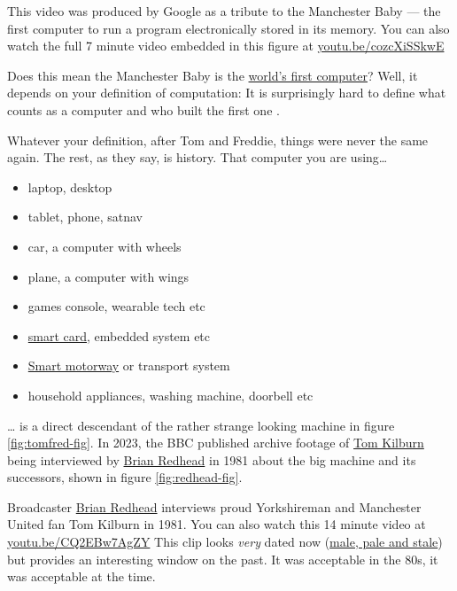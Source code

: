 \documentclass[
  12pt,
]{book}
\providecommand{\tightlist}{%
  \setlength{\itemsep}{0pt}\setlength{\parskip}{0pt}}
\begin{document}
\label{fig:baby-fig}This video was produced by Google as a tribute to the Manchester Baby --- the first computer to run a program electronically stored in its memory. You can also watch the full 7 minute video embedded in this figure at \href{https://youtu.be/cozcXiSSkwE}{youtu.be/cozcXiSSkwE} \citep{youtube-baby}



Does this mean the Manchester Baby is the \href{https://www.computerhope.com/issues/ch000984.htm}{world's first computer}? Well, it depends on your definition of computation: It is surprisingly hard to define what counts as a computer and who built the first one \citep{firstcomputer}.

Whatever your definition, after Tom and Freddie, things were never the same again. The rest, as they say, is history. That computer you are using\ldots{}

\begin{itemize}
\tightlist
\item
  laptop, desktop
\item
  tablet, phone, satnav
\item
  car, a computer with wheels
\item
  plane, a computer with wings
\item
  games console, wearable tech etc
\item
  \href{https://en.wikipedia.org/wiki/Smart_card}{smart card}, embedded system etc
\item
  \href{https://en.wikipedia.org/wiki/Smart_motorway}{Smart motorway} or transport system
\item
  household appliances, washing machine, doorbell etc
\end{itemize}

\ldots{} is a direct descendant of the rather strange looking machine in figure \ref{fig:tomfred-fig}. In 2023, the BBC published archive footage of \href{https://en.wikipedia.org/wiki/Tom_Kilburn}{Tom Kilburn} being interviewed by \href{https://en.wikipedia.org/wiki/Brian_Redhead}{Brian Redhead} in 1981 about the big machine and its successors, shown in figure \ref{fig:redhead-fig}.

\label{fig:redhead-fig}Broadcaster \href{https://en.wikipedia.org/wiki/Brian_Redhead}{Brian Redhead} interviews proud Yorkshireman and Manchester United fan Tom Kilburn in 1981. You can also watch this 14 minute video at \href{https://youtu.be/CQ2EBw7AgZY}{youtu.be/CQ2EBw7AgZY} \citep{youtube-redhead} This clip looks \emph{very} dated now (\href{https://www.oxfordreference.com/display/10.1093/acref/9780191827822.001.0001/acref-9780191827822-e-2138}{male, pale and stale}) but provides an interesting window on the past. It was acceptable in the 80s, it was acceptable at the time. \citep{acceptableinthe80s}
\end{document}
